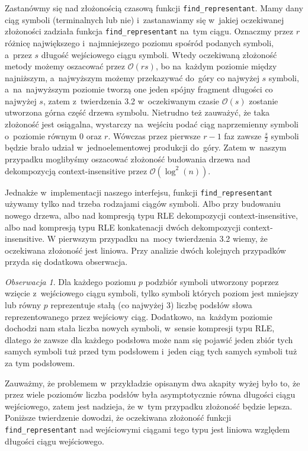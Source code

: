 \documentclass[declaration,shortabstract]{iithesis}
\theoremstyle{definition} \newtheorem{definition}{Definicja}[chapter]
\theoremstyle{remark} \newtheorem{remark}[definition]{Obserwacja}
\theoremstyle{plain} \newtheorem{theorem}[definition]{Twierdzenie}
\theoremstyle{remark} \newtheorem{example}{Przykład}[definition]
\theoremstyle{plain} \newtheorem{lemma}[definition]{Lemat}
\begin{document}
Zastanówmy się nad złożonością czasową funkcji \texttt{find\_representant}. Mamy dany ciąg symboli (terminalnych lub nie) i~zastanawiamy się w~jakiej oczekiwanej złożoności zadziała funkcja \texttt{find\_representant} na~tym ciągu. Oznaczmy przez $r$ różnicę największego i~najmniejszego poziomu spośród podanych symboli, a~przez $s$ długość wejściowego ciągu symboli. Wtedy oczekiwaną złożoność metody możemy oszacować przez $\mathcal{O}(rs)$, bo na~każdym poziomie między najniższym, a~najwyższym możemy przekazywać do~góry co najwyżej $s$ symboli, a~na~najwyższym poziomie tworzą one jeden spójny fragment długości co najwyżej $s$, zatem z~twierdzenia 3.2 w~oczekiwanym czasie $\mathcal{O}(s)$ zostanie utworzona górna część drzewa symbolu. Nietrudno też zauważyć, że taka złożoność jest osiągalna, wystarczy na~wejściu podać ciąg naprzemienny symboli o~poziomie równym $0$ oraz $r$. Wówczas przez pierwsze $r-1$ faz zawsze $\frac{s}{2}$ symboli będzie brało udział w~jednoelementowej produkcji do~góry. Zatem w~naszym przypadku moglibyśmy oszacować złożoność budowania drzewa nad dekompozycją context-insensitive przez $\mathcal{O}(\log^2(n))$.

Jednakże w~implementacji naszego interfejsu, funkcji \texttt{find\_representant} używamy tylko nad trzeba rodzajami ciągów symboli. Albo przy budowaniu nowego drzewa, albo nad kompresją typu RLE dekompozycji context-insensitive, albo nad kompresją typu RLE konkatenacji dwóch dekompozycji context-insensitive. W pierwszym przypadku na~mocy twierdzenia 3.2 wiemy, że oczekiwana złożoność jest liniowa. Przy analizie dwóch kolejnych przypadków przyda się dodatkowa obserwacja.

\begin{remark}
    Dla każdego poziomu $p$ podzbiór symboli utworzony poprzez wzięcie z~wejściowego ciągu symboli, tylko symboli których poziom jest mniejszy lub równy $p$ reprezentuje stałą (co najwyżej $3$) liczbę podsłów słowa reprezentowanego przez wejściowy ciąg. Dodatkowo, na~każdym poziomie dochodzi nam stała liczba nowych symboli, w~sensie kompresji typu RLE, dlatego że zawsze dla każdego podsłowa może nam się pojawić jeden zbiór tych samych symboli tuż przed tym podsłowem i~jeden ciąg tych samych symboli tuż za tym podsłowem.
\end{remark}

Zauważmy, że problemem w~przykładzie opisanym dwa akapity wyżej było to, że przez wiele poziomów liczba podsłów była asymptotycznie równa długości ciągu wejściowego, zatem jest nadzieja, że w~tym przypadku złożoność będzie lepsza. Poniższe twierdzenie dowodzi, że oczekiwana złożoność funkcji \texttt{find\_representant} nad wejściowymi ciągami tego typu jest liniowa względem długości ciągu wejściowego.
\end{document}
